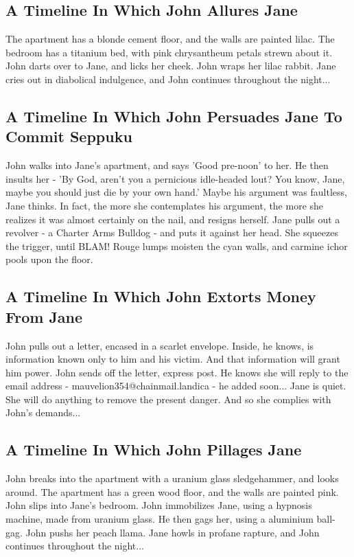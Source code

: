 \documentclass{article}
\begin{document}
\subsection{A Timeline In Which John Allures Jane}


The apartment has a blonde cement floor, and the walls are painted lilac.
The bedroom has a titanium bed, with pink chrysantheum petals strewn about it.
John darts over to Jane, and licks her cheek.
John wraps her lilac rabbit.
Jane cries out in diabolical indulgence, and John continues throughout the night...
\subsection{A Timeline In Which John Persuades Jane To Commit Seppuku}


John walks into Jane's apartment, and says 'Good pre{-}noon' to her.
He then insults her {-} 'By God, aren't you a pernicious idle{-}headed lout?
You know, Jane, maybe you should just die by your own hand.'
Maybe his argument was faultless, Jane thinks.
In fact, the more she contemplates his argument, the more she realizes it was almost certainly on the nail, and resigns herself.
Jane pulls out a revolver {-} a Charter Arms Bulldog {-} and puts it against her head.
She squeezes the trigger, until BLAM!
Rouge lumps moisten the cyan walls, and carmine ichor pools upon the floor.
\subsection{A Timeline In Which John Extorts Money From Jane}


John pulls out a letter, encased in a scarlet envelope. Inside, he knows, is information known only to him and his victim. And that information will grant him power.
John sends off the letter, express post. He knows she will reply to the email address {-} mauvelion354@chainmail.landica {-} he added soon...
Jane is quiet. She will do anything to remove the present danger. And so she complies with John's demands...
\subsection{A Timeline In Which John Pillages Jane}


John breaks into the apartment with a uranium glass sledgehammer, and looks around.
The apartment has a green wood floor, and the walls are painted pink.
John slips into Jane's bedroom.
John immobilizes Jane, using a hypnosis machine, made from uranium glass.
He then gags her, using a aluminium ball{-}gag.
John pushs her peach llama.
Jane howls in profane rapture, and John continues throughout the night...
\end{document}
